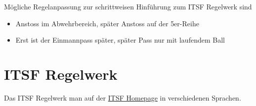 Mögliche Regelanpassung zur schrittweisen Hinführung zum ITSF Regelwerk sind 
\begin{itemize}
\item Anstoss im Abwehrbereich, später Anstoss auf der 5er-Reihe
\item Erst ist der Einmannpass später, später Pass nur mit laufendem Ball
\end{itemize}

\section{ITSF Regelwerk}
\label{regeln:itsf}

Das ITSF Regelwerk man auf der \href{http://www.table-soccer.org/page/rules}{ITSF Homepage} in verschiedenen Sprachen.

